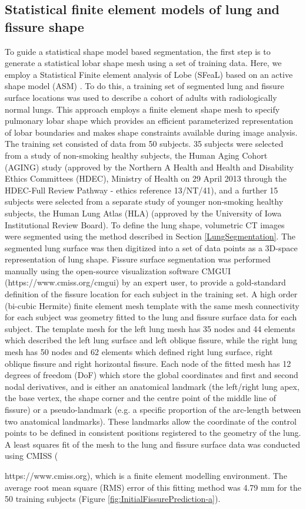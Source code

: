 \documentclass[]{spie}  %
\begin{document}
\subsection{Statistical finite element models of lung and fissure shape} \label{ShapeModelGeneration}
To guide a statistical shape model based segmentation, the first step is to generate a statistical lobar shape mesh using a set of training data. Here, we employ a Statistical Finite element analysis of Lobe (SFeaL) based on an active shape model (ASM) \cite{cootes1995active}. To do this, a training set of segmented lung and fissure surface locations was used to describe a cohort of adults with radiologically normal lungs. This approach employs a finite element shape mesh to specify pulmonary lobar shape which provides an efficient parameterized representation of lobar boundaries and makes shape constraints available during image analysis. The training set consisted of data from 50 subjects. 35 subjects were selected from a study of non-smoking healthy subjects, the Human Aging Cohort (AGING) study (approved by the Northern A Health and Health and Disability Ethics Committees (HDEC), Ministry of Health on 29 April 2013 through the HDEC-Full Review Pathway - ethics reference 13/NT/41), and a further 15 subjects were selected from a separate study of younger non-smoking healthy subjects, the Human Lung Atlas (HLA) (approved by the University of Iowa Institutional Review Board). To define the lung shape, volumetric CT images were segmented using the method described in Section \ref{LungSegmentation}. The segmented lung surface was then digitized into a set of data points as a 3D-space representation of lung shape. Fissure surface segmentation was performed manually using the open-source visualization software CMGUI (https://www.cmiss.org/cmgui) by an expert user, to provide a gold-standard definition of the fissure location for each subject in the training set. A high order (bi-cubic Hermite) finite element mesh template with the same mesh connectivity for each subject was geometry fitted to the lung and fissure surface data for each subject. The template mesh for the left lung mesh has 35 nodes and 44 elements which described the left lung surface and left oblique fissure, while the right lung mesh has 50 nodes and 62 elements which defined right lung surface, right oblique fissure and right horizontal fissure. Each node of the fitted mesh has 12 degrees of freedom (DoF) which store the global coordinates and first and second nodal derivatives, and is either an anatomical landmark (the left/right lung apex, the base vertex, the shape corner and the centre point of the middle line of fissure) or a pseudo-landmark (e.g. a specific proportion of the arc-length between two anatomical landmarks). These landmarks allow the coordinate of the control points to be defined in consistent positions registered to the geometry of the lung. A least squares fit of the mesh to the lung and fissure surface data was conducted using CMISS ({https://www.cmiss.org), which is a finite element modelling environment. The average root mean square (RMS) error of this fitting method was 4.79 mm for the 50 training subjects (Figure \ref{fig:InitialFissurePrediction-a}). 

}
\end{document}
